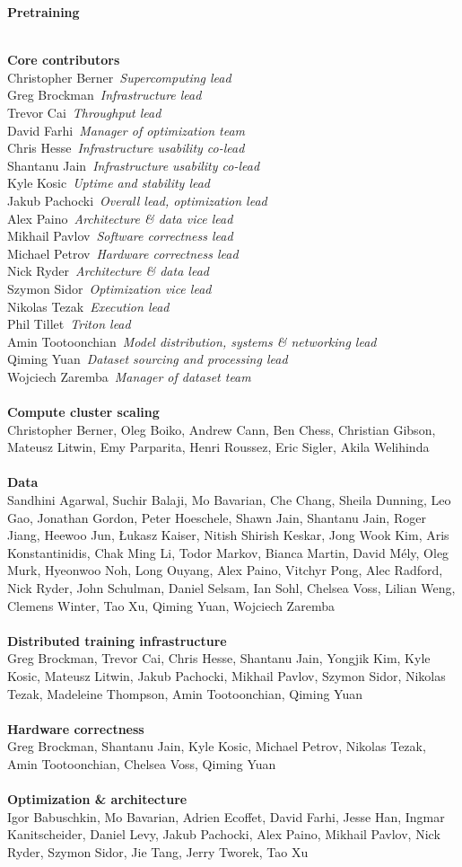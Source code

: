 \documentclass{article}
\newcommand{\creditsectionheader}[1]{\parbox{\columnwidth}{\centering \textbf{\small #1}}\\}
\newcommand{\creditlistheader}[1]{\textbf{#1}\footnotemark[\thefootnote]\\}
\newcommand{\creditlist}[2]{\creditlistheader{#1}#2\\
\\}
\newcommand{\corecontributor}[2]{#1\ \textit{#2}\\}
\begin{document}
\begin{multicols}{2}
\scriptsize
{}
\creditsectionheader{Pretraining}
\creditlistheader{Core contributors}
\corecontributor{Christopher Berner}{Supercomputing lead}
\corecontributor{Greg Brockman}{Infrastructure lead}
\corecontributor{Trevor Cai}{Throughput lead}
\corecontributor{David Farhi}{Manager of optimization team}
\corecontributor{Chris Hesse}{Infrastructure usability co-lead}
\corecontributor{Shantanu Jain}{Infrastructure usability co-lead}
\corecontributor{Kyle Kosic}{Uptime and stability lead}
\corecontributor{Jakub Pachocki}{Overall lead, optimization lead}
\corecontributor{Alex Paino}{Architecture \& data vice lead}
\corecontributor{Mikhail Pavlov}{Software correctness lead}
\corecontributor{Michael Petrov}{Hardware correctness lead}
\corecontributor{Nick Ryder}{Architecture \& data lead}
\corecontributor{Szymon Sidor}{Optimization vice lead}
\corecontributor{Nikolas Tezak}{Execution lead}
\corecontributor{Phil Tillet}{Triton lead}
\corecontributor{Amin Tootoonchian}{Model distribution, systems \& networking lead}
\corecontributor{Qiming Yuan}{Dataset sourcing and processing lead}
\corecontributor{Wojciech Zaremba}{Manager of dataset team}
\\
\creditlist{Compute cluster scaling}{Christopher Berner, Oleg Boiko, Andrew Cann, Ben Chess, Christian Gibson, Mateusz Litwin, Emy Parparita, Henri Roussez, Eric Sigler, Akila Welihinda}
\creditlist{Data}{Sandhini Agarwal, Suchir Balaji, Mo Bavarian, Che Chang, Sheila Dunning, Leo Gao, Jonathan Gordon, Peter Hoeschele, Shawn Jain, Shantanu Jain, Roger Jiang, Heewoo Jun, \L{}ukasz Kaiser, Nitish Shirish Keskar, Jong Wook Kim, Aris Konstantinidis, Chak Ming Li, Todor Markov, Bianca Martin, David M\'ely, Oleg Murk, Hyeonwoo Noh, Long Ouyang, Alex Paino, Vitchyr Pong, Alec Radford, Nick Ryder, John Schulman, Daniel Selsam, Ian Sohl, Chelsea Voss, Lilian Weng, Clemens Winter, Tao Xu, Qiming Yuan, Wojciech Zaremba}
\creditlist{Distributed training infrastructure}{Greg Brockman, Trevor Cai, Chris Hesse, Shantanu Jain, Yongjik Kim, Kyle Kosic, Mateusz Litwin, Jakub Pachocki, Mikhail Pavlov, Szymon Sidor, Nikolas Tezak, Madeleine Thompson, Amin Tootoonchian, Qiming Yuan}
\creditlist{Hardware correctness}{Greg Brockman, Shantanu Jain, Kyle Kosic, Michael Petrov, Nikolas Tezak, Amin Tootoonchian, Chelsea Voss, Qiming Yuan}
\creditlist{Optimization \& architecture}{
Igor Babuschkin, Mo Bavarian, Adrien Ecoffet, David Farhi, Jesse Han, Ingmar Kanitscheider, Daniel Levy, Jakub Pachocki, Alex Paino, Mikhail Pavlov, Nick Ryder, Szymon Sidor, Jie Tang, Jerry Tworek, Tao Xu}

\end{multicols}
\end{document}
